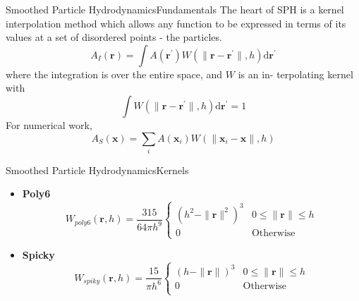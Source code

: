 \documentclass{beamer}
\begin{document}
\begin{frame}{Smoothed Particle Hydrodynamics}{Fundamentals}
The heart of SPH is a kernel interpolation method which allows any function to be expressed in terms of its values at a set of disordered points - the particles.
\pause
\begin{equation}
        A_{I}(\textbf{r}) = \int A({\textbf{r}}^{\prime})W(\|\textbf{r} - \textbf{r}^{\prime}\|, h)\mathrm{d}\textbf{r}^{\prime}
\end{equation}
\pause
where the integration is over the entire space, and $W$ is an in-
terpolating kernel with
\pause
\begin{equation}
        \int W(\|\textbf{r} - \textbf{r}^{\prime}\|, h)\mathrm{d} \textbf{r}^{\prime} = 1
\end{equation}
For numerical work,
\pause
\begin{equation}
        A_{S}(\textbf{x}) = \sum_{i}A(\textbf{x}_{i})W(\|\textbf{x}_{i}-\textbf{x}\|, h)
\end{equation}

\end{frame}
\begin{frame}{Smoothed Particle Hydrodynamics}{Kernels}
\begin{itemize}
\item {
\textbf{Poly6}
\pause
\begin{equation}
        W_{poly 6}(\textbf{r}, h) = \frac{315}{64\pi h^{9}}
            \begin{cases}
                (h^2 - \|\textbf{r}\|^2)^3 & 0 \le \|\textbf{r}\| \le h \\
                0 & \textrm{Otherwise}
            \end{cases}
\end{equation}
\pause
}
\item {
\textbf{Spicky}
\pause
\begin{equation}
        W_{spiky}(\textbf{r}, h) = \frac{15}{\pi h^6}
            \begin{cases}
                (h - \|\textbf{r}\|)^3 & 0\le\|\textbf{r}\|\le h \\
                0 & \textrm{Otherwise}\\
            \end{cases}
\end{equation}
}
\end{itemize}
\end{frame}
\end{document}
